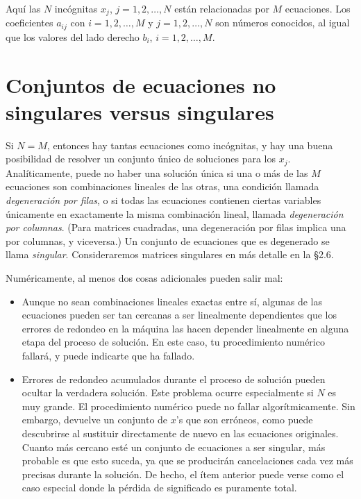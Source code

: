 \documentclass[10pt,a4paper]{book}
\begin{document}
Aquí las \( N \) incógnitas \( x_j \), \( j = 1, 2, \dots, N \) están relacionadas por \( M \) ecuaciones. Los coeficientes \( a_{ij} \) con \( i = 1, 2, \dots, M \) y \( j = 1, 2, \dots, N \) son números conocidos, al igual que los valores del lado derecho \( b_i \), \( i = 1, 2, \dots, M \).

\section{Conjuntos de ecuaciones no singulares versus singulares}

Si \( N = M \), entonces hay tantas ecuaciones como incógnitas, y hay una buena posibilidad de resolver un conjunto único de soluciones para los \( x_j \). Analíticamente, puede no haber una solución única si una o más de las \( M \) ecuaciones son combinaciones lineales de las otras, una condición llamada \textit{degeneración por filas}, o si todas las ecuaciones contienen ciertas variables únicamente en exactamente la misma combinación lineal, llamada \textit{degeneración por columnas}. (Para matrices cuadradas, una degeneración por filas implica una por columnas, y viceversa.) Un conjunto de ecuaciones que es degenerado se llama \textit{singular}. Consideraremos matrices singulares en más detalle en la \S2.6.

\medskip

Numéricamente, al menos dos cosas adicionales pueden salir mal:

\begin{itemize}
  \item Aunque no sean combinaciones lineales exactas entre sí, algunas de las ecuaciones pueden ser tan cercanas a ser linealmente dependientes que los errores de redondeo en la máquina las hacen depender linealmente en alguna etapa del proceso de solución. En este caso, tu procedimiento numérico fallará, y puede indicarte que ha fallado.
  
  \item Errores de redondeo acumulados durante el proceso de solución pueden ocultar la verdadera solución. Este problema ocurre especialmente si \( N \) es muy grande. El procedimiento numérico puede no fallar algorítmicamente. Sin embargo, devuelve un conjunto de \( x \)'s que son erróneos, como puede descubrirse al sustituir directamente de nuevo en las ecuaciones originales. Cuanto más cercano esté un conjunto de ecuaciones a ser singular, más probable es que esto suceda, ya que se producirán cancelaciones cada vez más precisas durante la solución. De hecho, el ítem anterior puede verse como el caso especial donde la pérdida de significado es puramente total.
\end{itemize}
\end{document}
